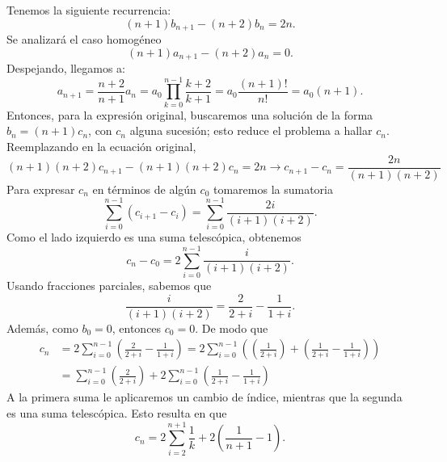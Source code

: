 \begin{solucion}
    Tenemos la siguiente recurrencia:
    \begin{equation*}
        (n+1)b_{n+1}-(n+2)b_{n}=2n.
    \end{equation*}
    Se analizará el caso homogéneo
    \begin{equation*}
        (n+1)a_{n+1}-(n+2)a_{n}=0.
    \end{equation*}
    Despejando, llegamos a:
    \begin{equation*}
        a_{n+1}=\frac{n+2}{n+1}a_n=a_0\prod_{k=0}^{n-1}\frac{k+2}{k+1}=a_0\frac{(n+1)!}{n!}=a_0(n+1).
    \end{equation*}
    Entonces, para la expresión original, buscaremos una solución de la forma $b_n=(n+1)c_n$, con $c_n$ alguna sucesión; esto reduce el problema a hallar $c_n$. Reemplazando en la ecuación original,
    \begin{equation*}
        (n+1)(n+2)c_{n+1}-(n+1)(n+2)c_{n}=2n\rightarrow c_{n+1}-c_n=\frac{2n}{(n+1)(n+2)}
    \end{equation*}
    Para expresar $c_n$ en términos de algún $c_0$ tomaremos la sumatoria
    \begin{equation*}
        \sum_{i=0}^{n-1}(c_{i+1}-c_i)=\sum_{i=0}^{n-1}\frac{2i}{(i+1)(i+2)}.
    \end{equation*}
    Como el lado izquierdo es una suma telescópica, obtenemos
    \begin{equation*}
        c_{n}-c_0=2\sum_{i=0}^{n-1}\frac{i}{(i+1)(i+2)}.
    \end{equation*}
    Usando fracciones parciales, sabemos que
    \begin{equation*}
        \frac{i}{(i+1)(i+2)}=\frac{2}{2+i}-\frac{1}{1+i}.
    \end{equation*}
    Además, como $b_0=0$, entonces $c_0=0$. De modo que
    \begin{align*}
        c_n&=2\sum_{i=0}^{n-1}\left(\frac{2}{2+i}-\frac{1}{1+i}\right)=2\sum_{i=0}^{n-1}\left(\left(\frac{1}{2+i}\right)+\left(\frac{1}{2+i}-\frac{1}{1+i}\right)\right)\\
        &=\sum_{i=0}^{n-1}\left(\frac{2}{2+i}\right)+2\sum_{i=0}^{n-1}\left(\frac{1}{2+i}-\frac{1}{1+i}\right)
    \end{align*}
    A la primera suma le aplicaremos un cambio de índice, mientras que la segunda es una suma telescópica. Esto resulta en que
    \begin{equation*}
        c_n=2\sum_{i=2}^{n+1}\frac{1}{k}+2\left(\frac{1}{n+1}-1\right).

\end{equation*}
\end{solucion}
